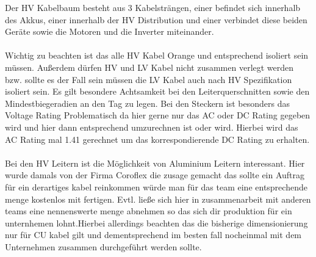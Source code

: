 Der HV Kabelbaum besteht aus 3 Kabelsträngen, einer befindet sich innerhalb des Akkus, einer innerhalb der HV Distribution und einer verbindet diese beiden Geräte sowie die Motoren und die Inverter miteinander.\\
\\
Wichtig zu beachten ist das alle HV Kabel Orange und entsprechend isoliert sein müssen. Außerdem dürfen HV und LV Kabel nicht zusammen verlegt werden bzw. sollte es der Fall sein müssen die LV Kabel auch nach HV Spezifikation isoliert sein.
Es gilt besondere Achtsamkeit bei den Leiterquerschnitten sowie den Mindestbiegeradien an den Tag zu legen. Bei den Steckern ist besonders das Voltage Rating Problematisch da hier gerne nur das AC oder DC Rating gegeben wird und hier dann entsprechend umzurechnen ist oder wird. Hierbei wird das AC Rating mal 1.41 gerechnet um das korrespondierende DC Rating zu erhalten. \\
\\
Bei den HV Leitern ist die Möglichkeit von Aluminium Leitern interessant. Hier wurde damals von der Firma Coroflex die zusage gemacht das sollte ein Auftrag für ein derartiges kabel reinkommen würde man für das team eine entsprechende menge kostenlos mit fertigen. Evtl. ließe sich hier in zusammenarbeit mit anderen teams eine nennenswerte menge abnehmen so das sich dir produktion für ein unternhemen lohnt.Hierbei allerdings beachten das die bisherige dimensionierung nur für CU kabel gilt und dementsprechend im besten fall nocheinmal mit dem Unternehmen zusammen durchgeführt werden sollte.\\
\\
